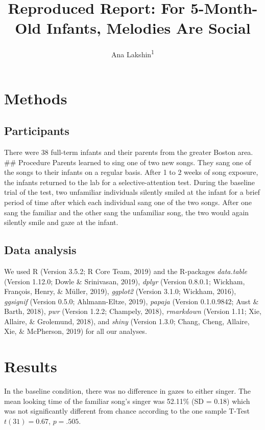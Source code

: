 \documentclass[man,floatsintext]{apa6}
\title{Reproduced Report: For 5-Month-Old Infants, Melodies Are Social}
\author{Ana Lakshin\textsuperscript{1}}
\date{}
\affiliation{
\vspace{0.5cm}
\textsuperscript{1} Brooklyn College}
\begin{document}
\maketitle

\section{Methods}\label{methods}

\subsection{Participants}\label{participants}

There were 38 full-term infants and their parents from the greater
Boston area. \#\# Procedure Parents learned to sing one of two new
songs. They sang one of the songs to their infants on a regular basis.
After 1 to 2 weeks of song exposure, the infants returned to the lab for
a selective-attention test. During the baseline trial of the test, two
unfamiliar individuals silently smiled at the infant for a brief period
of time after which each individual sang one of the two songs. After one
sang the familiar and the other sang the unfamiliar song, the two would
again silently smile and gaze at the infant.

\subsection{Data analysis}\label{data-analysis}

We used R (Version 3.5.2; R Core Team, 2019) and the R-packages
\emph{data.table} (Version 1.12.0; Dowle \& Srinivasan, 2019),
\emph{dplyr} (Version 0.8.0.1; Wickham, François, Henry, \& Müller,
2019), \emph{ggplot2} (Version 3.1.0; Wickham, 2016), \emph{ggsignif}
(Version 0.5.0; Ahlmann-Eltze, 2019), \emph{papaja} (Version 0.1.0.9842;
Aust \& Barth, 2018), \emph{pwr} (Version 1.2.2; Champely, 2018),
\emph{rmarkdown} (Version 1.11; Xie, Allaire, \& Grolemund, 2018), and
\emph{shiny} (Version 1.3.0; Chang, Cheng, Allaire, Xie, \& McPherson,
2019) for all our analyses.

\section{Results}\label{results}

In the baseline condition, there was no difference in gazes to either
singer. The mean looking time of the familiar song's singer was 52.11\%
(SD = 0.18) which was not significantly different from chance according
to the one sample T-Test \(t(31) = 0.67\), \(p = .505\).
\end{document}
